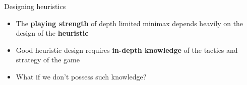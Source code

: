 \begin{frame}{Designing heuristics}
	\begin{itemize}
		\pause\item The \textbf{playing strength} of depth limited minimax depends heavily on the design of the \textbf{heuristic}
		\pause\item Good heuristic design requires \textbf{in-depth knowledge} of the tactics and strategy of the game
		\pause\item What if we don't possess such knowledge?
	\end{itemize}
\end{frame}

